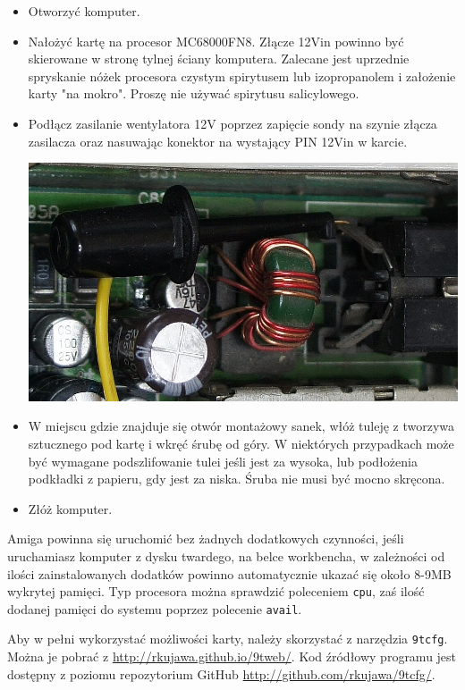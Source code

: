 \documentclass[10pt,a5paper]{article}
\begin{document}
\begin{itemize}
	\item Otworzyć komputer.
	\item Nałożyć kartę na procesor MC68000FN8. Złącze 12Vin powinno być skierowane w stronę tylnej ściany komputera. Zalecane jest uprzednie spryskanie nóżek procesora czystym spirytusem lub izopropanolem i założenie karty "na mokro". Proszę nie używać spirytusu salicylowego.
	\item Podłącz zasilanie wentylatora 12V poprzez zapięcie sondy na szynie złącza zasilacza oraz nasuwając konektor na wystający PIN 12Vin w karcie.\\
	\begin{center}
	\includegraphics[scale=1]{probe.jpg}
	\end{center}

	\item W miejscu gdzie znajduje się otwór montażowy sanek, włóż tuleję z tworzywa sztucznego pod kartę  i wkręć śrubę od góry. W niektórych przypadkach może być wymagane podszlifowanie tulei jeśli jest za wysoka, lub podłożenia podkładki z papieru, gdy jest za niska. Śruba nie musi być mocno skręcona.
	\item Złóż komputer.
\end{itemize}


Amiga powinna się uruchomić bez żadnych dodatkowych czynności, jeśli uruchamiasz komputer z dysku twardego, na belce workbencha, w zależności od ilości zainstalowanych dodatków powinno automatycznie ukazać się około 8-9MB wykrytej pamięci. Typ procesora można sprawdzić poleceniem {\tt cpu}, zaś ilość dodanej pamięci do systemu poprzez polecenie {\tt avail}.

Aby w pełni wykorzystać możliwości karty, należy skorzystać z narzędzia  {\tt 9tcfg}. Można je pobrać z \url{http://rkujawa.github.io/9tweb/}. Kod źródłowy programu jest dostępny z poziomu repozytorium GitHub \url{http://github.com/rkujawa/9tcfg/}.
\end{document}
